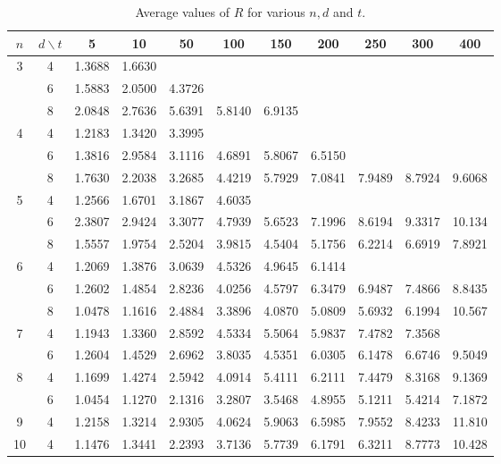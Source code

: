 \documentclass{amsart}
\theoremstyle{definition}
\begin{document}
\begin{table}[ht]{\footnotesize
\caption{Average values of $R$ for various $n, d$ and $t$.}\label{PartitionTable}
\centering
\begin{tabular}{|c|c|ccccccccc|}
\hline
$n$ & $d\backslash t$ & 5 & 10 & 50 & 100 & 150 & 200 & 250 & 300 & 400 \\
\hline
\multirow{3}{*}{3} & 4 & 1.3688 & 1.6630 & & & & & & & \\
				   & 6 & 1.5883 & 2.0500 & 4.3726 & & & & & & \\
				   & 8 & 2.0848 & 2.7636 & 5.6391 & 5.8140 & 6.9135 & & & & \\
\hline
\multirow{3}{*}{4} & 4 & 1.2183 & 1.3420 & 3.3995 & & & & & & \\
				   & 6 & 1.3816 & 2.9584 & 3.1116 & 4.6891 & 5.8067 & 6.5150 & & & \\
				   & 8 & 1.7630 & 2.2038 & 3.2685 & 4.4219 & 5.7929 & 7.0841 & 7.9489 & 8.7924 & 9.6068 \\
\hline
\multirow{3}{*}{5} & 4 & 1.2566 & 1.6701 & 3.1867 & 4.6035 & & & & & \\
				   & 6 & 2.3807 & 2.9424 & 3.3077 & 4.7939 & 5.6523 & 7.1996 & 8.6194 & 9.3317 & 10.134\\
				   & 8 & 1.5557 & 1.9754 & 2.5204 & 3.9815 & 4.5404 & 5.1756 & 6.2214 & 6.6919 & 7.8921 \\
\hline
\multirow{3}{*}{6} & 4 & 1.2069 & 1.3876 & 3.0639 & 4.5326 & 4.9645 & 6.1414 & & & \\
				   & 6 & 1.2602 & 1.4854 & 2.8236 & 4.0256 & 4.5797 & 6.3479 & 6.9487 & 7.4866 & 8.8435 \\
				   & 8 & 1.0478 & 1.1616 & 2.4884 & 3.3896 & 4.0870 & 5.0809 & 5.6932 & 6.1994 & 10.567 \\
\hline
\multirow{2}{*}{7} & 4 & 1.1943 & 1.3360 & 2.8592 & 4.5334 & 5.5064 & 5.9837 & 7.4782 & 7.3568 & \\
				   & 6 & 1.2604 & 1.4529 & 2.6962 & 3.8035 & 4.5351 & 6.0305 & 6.1478 & 6.6746 & 9.5049 \\
\hline
\multirow{2}{*}{8} & 4 & 1.1699 & 1.4274 & 2.5942 & 4.0914 & 5.4111 & 6.2111 & 7.4479 & 8.3168 & 9.1369 \\
				   & 6 & 1.0454 & 1.1270 & 2.1316 & 3.2807 & 3.5468 & 4.8955 & 5.1211 & 5.4214 & 7.1872 \\
\hline
\multirow{1}{*}{9} & 4 & 1.2158 & 1.3214 & 2.9305 & 4.0624 & 5.9063 & 6.5985 & 7.9552 & 8.4233 & 11.810 \\
\hline
\multirow{1}{*}{10} & 4 & 1.1476 & 1.3441 & 2.2393 & 3.7136 & 5.7739 & 6.1791 & 6.3211 & 8.7773 & 10.428 \\
\hline
\end{tabular}}
\end{table}
%
\end{document}
